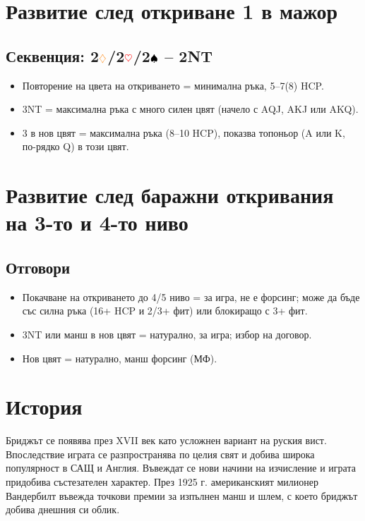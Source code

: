 \documentclass[10pt,a5paper]{extarticle}
\newcommand{\Rheart}{\textcolor{red}{\heartsuit}}
\newcommand{\Rdiamond}{\textcolor{orange}{\diamondsuit}}
\newcommand{\Bspade}{\textcolor{black}{\spadesuit}}
\begin{document}
\section{Развитие след откриване 1 в мажор}

\subsection*{Секвенция: 2$\Rdiamond$/2$\Rheart$/2$\Bspade$ – 2NT}
\begin{itemize}
  \item[] Повторение на цвета на откриването = минимална ръка, 5–7(8) HCP.
  \item[] 3NT = максимална ръка с много силен цвят  
  (начело с AQJ, AKJ или AKQ).
  \item[] 3 в нов цвят = максимална ръка (8–10 HCP), показва топоньор  
  (A или K, по-рядко Q) в този цвят.
\end{itemize}

\section{Развитие след баражни откривания на 3-то и 4-то ниво}

\subsection*{Отговори}
\begin{itemize}
  \item[] Покачване на откриването до 4/5 ниво = за игра, не е форсинг;  
  може да бъде със силна ръка (16+ HCP и 2/3+ фит) или блокиращо с 3+ фит.
  \item[] 3NT или манш в нов цвят = натурално, за игра; избор на договор.
  \item[] Нов цвят = натурално, манш форсинг (МФ).
\end{itemize}

\section{История}
Бриджът се появява през XVII век като усложнен вариант на руския вист.  
Впоследствие играта се разпространява по целия свят и добива широка популярност в САЩ и Англия.  
Въвеждат се нови начини на изчисление и играта придобива състезателен характер.  
През 1925 г. американският милионер Вандербилт въвежда точкови премии за изпълнен манш и шлем, с което бриджът добива днешния си облик.
\newpage
\end{document}
